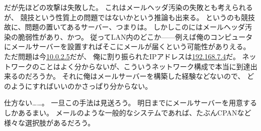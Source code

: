 だが先ほどの攻撃は失敗した。
これはメールヘッダ汚染の失敗とも考えられるが、
競技という性質上の問題ではないかという推論も出来る。
というのも競技故に、問題の置いてあるサーバー、つまりは。
しかしこのにはメールヘッダ汚染の脆弱性があり、かつ。
従ってLAN内のどこか------例えば俺のコンピュータにメールサーバーを設置すればそこにメールが届くという可能性がありえる。
ただ問題は今\url{10.0.2.5}だが、
俺に割り振られたIPアドレスは\url{192.168.7.4}だ。
ネットワークのことはよく分からないが、こういうネットワーク構成で本当に到達出来るのだろうか。
それに俺はメールサーバーを構築した経験などないので、
どのようにすればいいのかさっぱり分からない。

仕方ない……。
一旦この手法は見送ろう。
明日までにメールサーバーを用意するしかあるまい。
メールのような一般的なシステムであれば、たぶんCPANなど様々な選択肢があるだろう。

